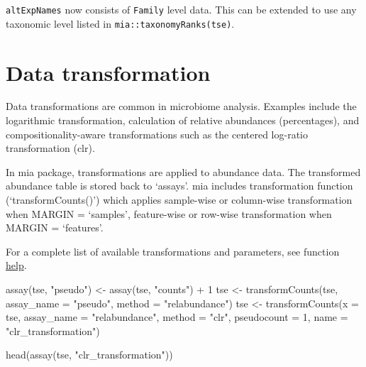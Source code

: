 \documentclass[
]{book}
\newenvironment{Shaded}{\begin{snugshade}}{\end{snugshade}}
\newcommand{\AttributeTok}[1]{\textcolor[rgb]{0.77,0.63,0.00}{#1}}
\newcommand{\DecValTok}[1]{\textcolor[rgb]{0.00,0.00,0.81}{#1}}
\newcommand{\FunctionTok}[1]{\textcolor[rgb]{0.00,0.00,0.00}{#1}}
\newcommand{\NormalTok}[1]{#1}
\newcommand{\OtherTok}[1]{\textcolor[rgb]{0.56,0.35,0.01}{#1}}
\newcommand{\SpecialCharTok}[1]{\textcolor[rgb]{0.00,0.00,0.00}{#1}}
\newcommand{\StringTok}[1]{\textcolor[rgb]{0.31,0.60,0.02}{#1}}
\begin{document}
\texttt{altExpNames} now consists of \texttt{Family} level data. This can be extended to use
any taxonomic level listed in \texttt{mia::taxonomyRanks(tse)}.

\hypertarget{data-transformation}{%
\section{Data transformation}\label{data-transformation}}

Data transformations are common in microbiome analysis. Examples
include the logarithmic transformation, calculation of relative
abundances (percentages), and compositionality-aware transformations
such as the centered log-ratio transformation (clr).

In mia package, transformations are applied to abundance data. The transformed
abundance table is stored back to `assays'. mia includes transformation
function (`transformCounts()') which applies sample-wise or column-wise transformation when MARGIN = `samples', feature-wise or row-wise transformation when MARGIN = `features'.

For a complete list of available transformations and parameters, see function
\href{https://microbiome.github.io/mia/reference/transformCounts.html}{help}.

\begin{Shaded}
\begin{Highlighting}[]
\FunctionTok{assay}\NormalTok{(tse, }\StringTok{"pseudo"}\NormalTok{) }\OtherTok{\textless{}{-}} \FunctionTok{assay}\NormalTok{(tse, }\StringTok{"counts"}\NormalTok{) }\SpecialCharTok{+} \DecValTok{1}
\NormalTok{tse }\OtherTok{\textless{}{-}} \FunctionTok{transformCounts}\NormalTok{(tse, }\AttributeTok{assay\_name =} \StringTok{"pseudo"}\NormalTok{, }\AttributeTok{method =} \StringTok{"relabundance"}\NormalTok{)}
\NormalTok{tse }\OtherTok{\textless{}{-}} \FunctionTok{transformCounts}\NormalTok{(}\AttributeTok{x =}\NormalTok{ tse, }\AttributeTok{assay\_name =} \StringTok{"relabundance"}\NormalTok{, }\AttributeTok{method =} \StringTok{"clr"}\NormalTok{, }
                        \AttributeTok{pseudocount =} \DecValTok{1}\NormalTok{, }\AttributeTok{name =} \StringTok{"clr\_transformation"}\NormalTok{)}

\FunctionTok{head}\NormalTok{(}\FunctionTok{assay}\NormalTok{(tse, }\StringTok{"clr\_transformation"}\NormalTok{))}
\end{Highlighting}
\end{Shaded}
\end{document}
